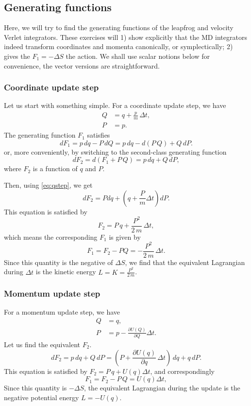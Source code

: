 \documentclass[aip,jcp,preprint,notitlepage, superscriptaddress]{revtex4-1}
\begin{document}
\subsection{Generating functions}


Here, we will try to find the generating functions
of the leapfrog and velocity Verlet integrators.
%
These exercises will 1) show explicitly that
the MD integrators indeed transform coordinates and momenta
canonically, or symplectically;
2) gives the $F_1 = -\Delta S$ the action.
%
We shall use scalar notions below for convenience,
the vector versions are straightforward.



\subsubsection{Coordinate update step}


Let us start with something simple.  For a coordinate update step, we have
%
\begin{equation}
\begin{aligned}
Q &= q + \frac{p}{m} \, \Delta t, \\
P &= p.
\end{aligned}
\label{eq:qstep}
\end{equation}
%
The generating function $F_1$ satisfies
$$
dF_1 = p \, dq - P \, dQ = p \, dq - d (P \, Q) + Q \, dP.
$$
or, more conveniently, by switching to the second-class generating function
$$
dF_2 = d (F_1 + P \,Q) = p \, dq + Q \, dP,
$$
where $F_2$ is a function of $q$ and $P$.

Then, using \eqref{eq:qstep}, we get
$$
dF_2
= P dq + \left(q + \frac{P}{m}\Delta t\right) dP.
$$
This equation is satisfied by
$$
F_2 = P \, q + \frac{P^2}{2 \, m} \, \Delta t,
$$
which means the corresponding $F_1$ is given by
$$
F_1 = F_2 - P Q = -\frac{P^2}{2 \, m} \, \Delta t.
$$
Since this quantity is the negative of $\Delta S$,
we find that the equivalent Lagrangian during $\Delta t$ is
the kinetic energy $L = K = \frac{ P^2 }{2 \, m}$.



\subsubsection{Momentum update step}


For a momentum update step, we have
%
\begin{equation}
\begin{aligned}
Q &= q, \\
P &= p - \frac{ \partial U(Q) } { \partial Q } \Delta t.
\end{aligned}
\end{equation}
%
Let us find the equivalent $F_2$.
%
$$
dF_2 = p \, dq + Q \, dP
= \left( P + \frac{\partial U(q) }{ \partial q} \, \Delta t\right) \, dq + q \, dP.
$$
This equation is satisfied by $F_2 = P \, q + U(q) \Delta t$,
and correspondingly
$$
F_1 = F_2 - P\, Q = U(q) \Delta t,
$$
Since this quantity is $-\Delta S$,
the equivalent Lagrangian during the update is
the negative potential energy $L = -U(q)$.
\end{document}
